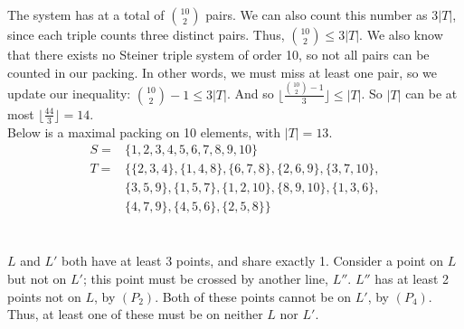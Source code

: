 \documentclass{article}
\begin{document}
\section{} %
The system has at a total of $\binom{10}{2}$ pairs. We can also count this number
as $3|T|$, since each triple counts three distinct pairs. Thus,
$\binom{10}{2}\le3|T|$. We also know that there exists no Steiner triple system
of order 10, so not all pairs can be counted in our packing. In other words, we
must miss at least one pair, so we update our inequality:
$\binom{10}{2}-1\le3|T|$. And so
$\Big\lfloor\frac{\binom{10}{2}-1}{3}\Big\rfloor\le|T|$. So $|T|$ can be at most
$\big\lfloor\frac{44}{3}\big\rfloor=14$.\\
Below is a maximal packing on 10 elements, with $|T|=13$.
\begin{align*}
	S=&\{1,2,3,4,5,6,7,8,9,10\}\\
	T=&\{\{2,3,4\},\{1,4,8\},\{6,7,8\},\{2,6,9\},\{3,7,10\},\\
	&\{3,5,9\},\{1,5,7\},\{1,2,10\},\{8,9,10\},\{1,3,6\},\\
	&\{4,7,9\},\{4,5,6\},\{2,5,8\}\}
\end{align*}
\section{} %
$L$ and $L'$ both have at least 3 points, and share exactly 1. Consider a point
on $L$ but not on $L'$; this point must be crossed by another line, $L''$. $L''$
has at least 2 points not on $L$, by $(P_2)$. Both of these points cannot be on
$L'$, by $(P_4)$. Thus, at least one of these must be on neither $L$ nor $L'$.
\end{document}
